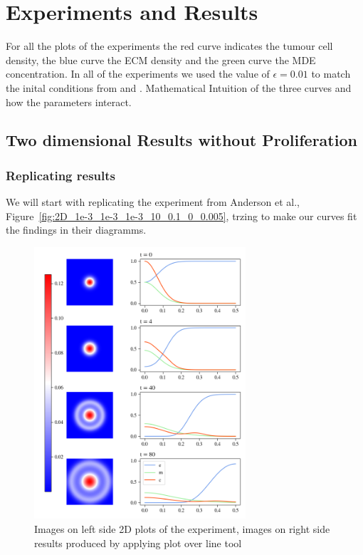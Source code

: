 

\section{Experiments and Results}
For all the plots of the experiments the red curve indicates the tumour cell density, the blue curve the ECM density and the green curve the MDE concentration. In all of the experiments we used the value of $\epsilon = 0.01$ to match the inital conditions from \cite{anderson_mathematical_2000} and \cite{Kolev2010}. \newline 
Mathematical Intuition of the three curves and how the parameters interact.


\subsection{Two dimensional Results without Proliferation}
\subsubsection{Replicating results}
We will start with replicating the experiment from  Anderson et al.\cite{anderson_mathematical_2000}, Figure~\ref{fig:2D_1e-3_1e-3_1e-3_10_0.1_0_0.005}, trzing to make our curves fit the findings in their diagramms. 


\begin{figure}[h]
    \centering
    \includegraphics[width=0.7\textwidth]{resources/images/first_replication_results.png}
    \caption{Images on left side 2D plots of the experiment, images on right side results produced by applying plot over line tool}
    \label{fig:replication_without_proliferation}
\end{figure}

